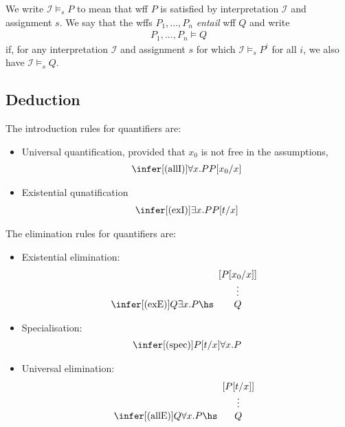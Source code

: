 \documentclass{article}
\begin{document}
\begin{definition}[Entailment]
	We write $\mathcal{I}\vDash_s P$ to mean that wff $P$ is satisfied by interpretation $\mathcal{I}$ and
	assignment $s$.  We say that the wffs $P_1,...,P_n$ \emph{entail} wff $Q$ and write
	\begin{align*}
		P_1,...,P_n\vDash Q
	\end{align*}
	if, for any interpretation $\mathcal{I}$ and assignment $s$ for which $\mathcal{I}\vDash_s P^i$ for all $i$,
	we also have $\mathcal{I}\vDash_s Q$.
\end{definition}

\subsection{Deduction}

\begin{definition}
	The introduction rules for quantifiers are:
	\begin{itemize}
		\item Universal quantification, provided that $x_0$ is not free in the assumptions, \begin{align*}
			      \infer[(\text{allI})]{\forall x. P}{P[x_0/x]}
		      \end{align*}
		\item Existential qunatification \begin{align*}
			      \infer[(\text{exI})]{\exists x.P}{P[t/x]}
		      \end{align*}
	\end{itemize}
\end{definition}

\begin{definition}
	The elimination rules for quantifiers are:
	\begin{itemize}
		\item Existential elimination: \begin{align*}
			      \infer[(\text{exE})]{Q}{\exists x.P\hs \begin{array}[b]{c}
					      [P[x_0/x]] \\
					      \vdots     \\
					      Q
				      \end{array}}
		      \end{align*}
		\item Specialisation: \begin{align*}
			      \infer[(\text{spec})]{P[t/x]}{\forall x.P}
		      \end{align*}
		\item Universal elimination: \begin{align*}
			      \infer[(\text{allE})]{Q}{\forall x.P\hs \begin{array}[b]{c}
					      [P[t/x]] \\
					      \vdots   \\
					      Q
				      \end{array}}
		      \end{align*}
	\end{itemize}
\end{definition}
\end{document}
